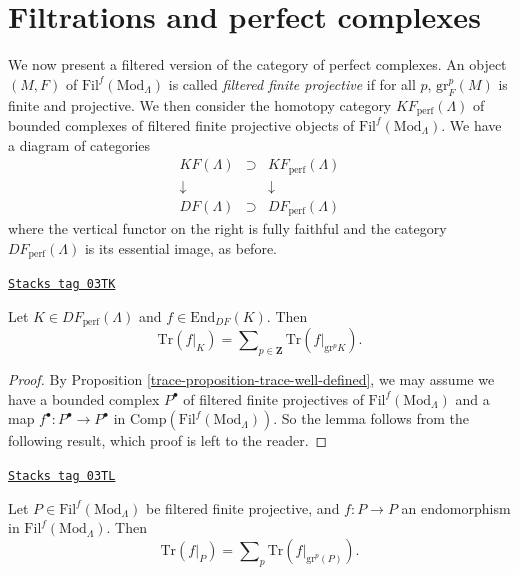 \section{Filtrations and perfect complexes}
\label{trace-section-filtrations-perfect}
We now present a filtered version of the category of perfect complexes. An
object $(M, F)$ of $\text{Fil}^f(\text{Mod}_\Lambda)$ is called {\it filtered
finite projective} if for all $p$, $\text{gr}^p_F (M)$ is finite and
projective. We then consider the homotopy category
$KF_{\text{perf}}(\Lambda)$ of bounded complexes of filtered finite
projective objects of $\text{Fil}^f(\text{Mod}_\Lambda)$. We have a diagram of
categories
$$
\begin{matrix}
KF(\Lambda) & \supset & KF_{\text{perf}}(\Lambda)\\
\downarrow & & \downarrow\\
DF(\Lambda) & \supset & DF_{\text{perf}}(\Lambda)
\end{matrix}
$$
where the vertical functor on the right is fully faithful and the category
$DF_{\text{perf}}(\Lambda)$ is its essential image, as before.

\begin{lemma}[Additivity]

\label{trace-lemma-additivity}
\href{https://stacks.math.columbia.edu/tag/03TK}{\texttt{Stacks tag 03TK}}

Let $K\in DF_{\text{perf}}(\Lambda)$ and $f\in
\text{End}_{DF}(K)$. Then
$$
\text{Tr}(f|_K) =
\sum\nolimits_{p\in \mathbf{Z}} \text{Tr}(f|_{\text{gr}^p K}).
$$
\end{lemma}

\begin{proof}

By Proposition \ref{trace-proposition-trace-well-defined}, we may assume we have
a bounded
complex $P^\bullet$ of filtered finite projectives of
$\text{Fil}^f(\text{Mod}_\Lambda)$ and a map $f^\bullet : P^\bullet\to
P^\bullet$ in $\text{Comp}(\text{Fil}^f(\text{Mod}_\Lambda))$. So the lemma
follows from the following result, which proof is left to the reader.
\end{proof}

\begin{lemma}
\label{trace-lemma-additive-filtered-finite-projective}
\href{https://stacks.math.columbia.edu/tag/03TL}{\texttt{Stacks tag 03TL}}

Let $P \in \text{Fil}^f(\text{Mod}_\Lambda)$ be filtered finite projective, and
$f : P \to P$ an endomorphism in $\text{Fil}^f(\text{Mod}_\Lambda)$. Then
$$
\text{Tr}(f|_P) =
\sum\nolimits_p \text{Tr}(f|_{\text{gr}^p(P)}).
$$
\end{lemma}

